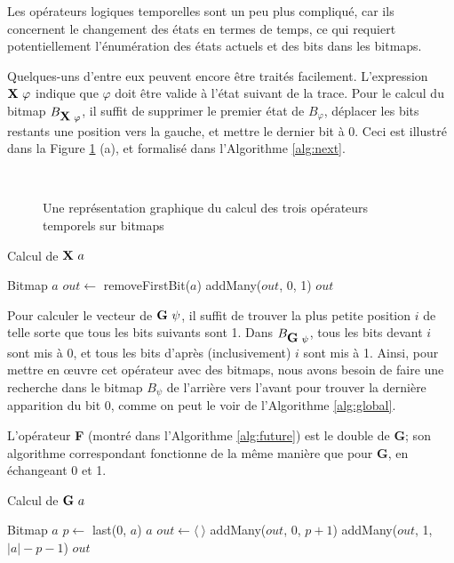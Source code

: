 Les opérateurs logiques temporelles sont un peu plus compliqué, car ils concernent le changement des états en termes de temps, ce qui requiert potentiellement l'énumération des états actuels et des bits dans les bitmaps.

Quelques-uns d'entre eux peuvent encore être traités facilement. L'expression $\mathop{\mbox{\textbf{X}}}\,\varphi$ indique que $\varphi$ doit être valide à l'état suivant de la trace. Pour le calcul du bitmap $B_{\mathop{\mbox{\textbf{X}}}\,\varphi}$, il suffit de supprimer le premier état de $B_\varphi$, déplacer les bits restants une position vers la gauche, et mettre le dernier bit à 0. Ceci est illustré dans la Figure \ref{fig:patterns} (a), et formalisé dans l'Algorithme \ref{alg:next}.

\begin{figure}
\centering
{}~~~
~~~
\caption{Une représentation graphique du calcul des trois opérateurs temporels sur bitmaps}
\label{fig:patterns}
\end{figure}

\begin{algorithm}
\caption{Calcul de $\mathop{\mbox{\textbf{X}}}\, a$}
\label{alg:next}
\begin{algorithmic}[1]
\Require Bitmap $a$
\State $out \gets$ removeFirstBit($a$)
\State addMany($out$, 0, 1)
\State \Return $out$
\end{algorithmic}
\end{algorithm}

Pour calculer le vecteur de $\mathop{\mbox{\textbf{G}}}\,\psi$, il suffit de trouver la plus petite position $i$ de telle sorte que tous les bits suivants sont 1. Dans $B_{\mathop{\mbox{\textbf{G}}}\,\psi} $, tous les bits devant $i$ sont mis à 0, et tous les bits d'après (inclusivement) $i$ sont mis à 1. Ainsi, pour mettre en \oe{}uvre cet opérateur avec des bitmaps, nous avons besoin de faire une recherche dans le bitmap $B_{\psi}$ de l'arrière vers l'avant pour trouver la dernière apparition du bit 0, comme on peut le voir de l'Algorithme \ref{alg:global}.

L'opérateur \textbf{F} (montré dans l'Algorithme \ref{alg:future}) est le double de \textbf{G}; son algorithme correspondant fonctionne de la même manière que pour \textbf{G}, en échangeant 0 et 1.

\begin{algorithm}
\caption{Calcul de $\mathop{\mbox{\textbf{G}}}\, a$}
\label{alg:global}
\begin{algorithmic}[1]
\Require Bitmap $a$
\State $p \gets$ last(0, $a$)
  \State \Return $a$
\Else
  \State $out \gets \langle~\rangle$
  \State addMany($out$, 0, $p + 1$)
  \State addMany($out$, 1, $|a| - p - 1$)
  \State \Return $out$
\EndIf
\end{algorithmic}
\end{algorithm}

